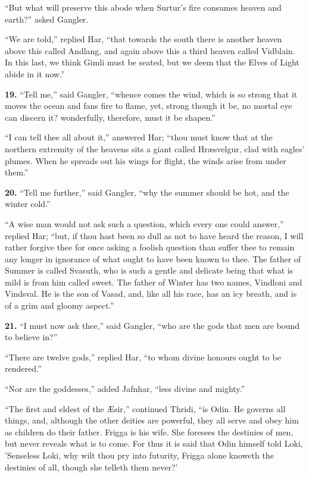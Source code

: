 ``But what will preserve this abode when Surtur's fire consumes heaven
and earth?'' asked Gangler.

``We are told,'' replied Har, ``that towards the south there is another
heaven above this called Andlang, and again above this a third heaven
called Vidblain. In this last, we think Gimli must be seated, but we
deem that the Elves of Light abide in it now.''


\textbf{19.} ``Tell me,'' said Gangler, ``whence comes the wind, which is so
strong that it moves the ocean and fans fire to flame, yet, strong
though it be, no mortal eye can discern it? wonderfully, therefore,
must it be shapen.''

``I can tell thee all about it,'' answered Har; ``thou must know that at
the northern extremity of the heavens sits a giant called Hræsvelgur,
clad with eagles' plumes. When he spreads out his wings for flight,
the winds arise from under them.''

\textbf{20.} ``Tell me further,'' said Gangler, ``why the summer should be hot,
and the winter cold.''

``A wise man would not ask such a question, which every one could
answer,'' replied Har; ``but, if thou hast been so dull as not to have
heard the reason, I will rather forgive thee for once asking a foolish
question than suffer thee to remain any longer in ignorance of what
ought to have been known to thee. The father of Summer is called
Svasuth, who is such a gentle and delicate being that what is mild is
from him called sweet. The father of Winter has two names, Vindloni
and Vindsval. He is the son of Vasad, and, like all his race, has an
icy breath, and is of a grim and gloomy aspect.''


\textbf{21.} ``I must now ask thee,'' said Gangler, ``who are the gods that men
are bound to believe in?''

``There are twelve gods,'' replied Har, ``to whom divine honours ought to
be rendered.''

``Nor are the goddesses,'' added Jafnhar, ``less divine and mighty.''

``The first and eldest of the Æsir,'' continued Thridi, ``is Odin. He
governs all things, and, although the other deities are powerful, they
all serve and obey him as children do their father. Frigga is his
wife. She foresees the destinies of men, but never reveals what is to
come. For thus it is said that Odin himself told Loki, 'Senseless
Loki, why wilt thou pry into futurity, Frigga alone knoweth the
destinies of all, though she telleth them never?'

